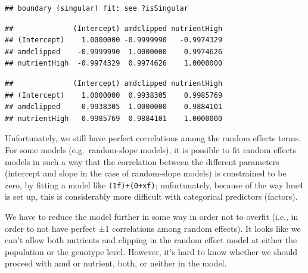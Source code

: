 \documentclass[
  12pt,
]{book}
\newenvironment{Shaded}{\begin{snugshade}}{\end{snugshade}}
\newcommand{\KeywordTok}[1]{\textcolor[rgb]{0.13,0.29,0.53}{\textbf{#1}}}
\newcommand{\NormalTok}[1]{#1}
\newcommand{\OperatorTok}[1]{\textcolor[rgb]{0.81,0.36,0.00}{\textbf{#1}}}
\newcommand{\StringTok}[1]{\textcolor[rgb]{0.31,0.60,0.02}{#1}}
\begin{document}
\begin{verbatim}
## boundary (singular) fit: see ?isSingular
\end{verbatim}

\begin{Shaded}
\end{Shaded}

\begin{verbatim}
##              (Intercept) amdclipped nutrientHigh
## (Intercept)    1.0000000 -0.9999990   -0.9974329
## amdclipped    -0.9999990  1.0000000    0.9974626
## nutrientHigh  -0.9974329  0.9974626    1.0000000
\end{verbatim}

\begin{Shaded}
\end{Shaded}

\begin{verbatim}
##              (Intercept) amdclipped nutrientHigh
## (Intercept)    1.0000000  0.9938305    0.9985769
## amdclipped     0.9938305  1.0000000    0.9884101
## nutrientHigh   0.9985769  0.9884101    1.0000000
\end{verbatim}

Unfortunately, we still have perfect correlations among the random effects terms. For some models (e.g.~random-slope models), it is possible to fit random effects models in such a way that the correlation between the different parameters (intercept and slope in the case of random-slope models) is constrained to be zero, by fitting a model like \texttt{(1\textbar{}f)+(0+x\textbar{}f)}; unfortunately, because of the way lme4 is set up, this is considerably more difficult with categorical predictors (factors).

We have to reduce the model further in some way in order not to overfit (i.e., in order to not have perfect ±1 correlations among random effects). It looks like we can't allow both nutrients and clipping in the random effect model at either the population or the genotype level. However, it's hard to know whether we should proceed with amd or nutrient, both, or neither in the model.
\end{document}

